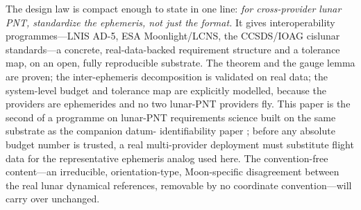 The design law is compact enough to state in one line: \emph{for cross-provider lunar
PNT, standardize the ephemeris, not just the format.} It gives interoperability
programmes---LNIS AD-5, ESA Moonlight/LCNS, the CCSDS/IOAG cislunar standards---a
concrete, real-data-backed requirement structure and a tolerance map, on an open,
fully reproducible substrate. The theorem and the gauge lemma are proven; the
inter-ephemeris decomposition is validated on real data; the system-level budget and
tolerance map are explicitly modelled, because the providers are ephemerides and no
two lunar-PNT providers fly. This paper is the second of a programme on lunar-PNT
requirements science built on the same substrate as the companion datum-%
identifiability paper \citep{baweja2026datum}; before any absolute budget number is
trusted, a real multi-provider deployment must substitute flight data for the
representative ephemeris analog used here. The convention-free content---an
irreducible, orientation-type, Moon-specific disagreement between the real lunar
dynamical references, removable by no coordinate convention---will carry over
unchanged.
